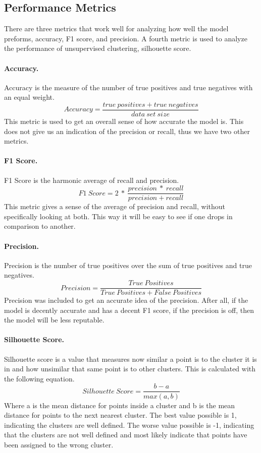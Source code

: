 \documentclass{article}
\begin{document}
\subsection{Performance Metrics} \label{Performance_Metrics}
\par
There are three metrics that work well for analyzing how well the model preforms, accuracy, F1 score, and precision. A fourth metric is used to analyze the performance of unsupervised clustering, silhouette score.

\paragraph{Accuracy.}
Accuracy is the measure of the number of true positives and true negatives with an equal weight.
$$Accuracy = \frac{true\ positives + true\ negatives}{data\ set\ size}$$
This metric is used to get an overall sense of how accurate the model is. This does not give us an indication of the precision or recall, thus we have two other metrics.

\paragraph{F1 Score.}
F1 Score is the harmonic average of recall and precision.
$$F1\ Score = 2\ \ast \ \frac{precision\ \ast \ recall}{precision + recall}$$
This metric gives a sense of the average of precision and recall, without specifically looking at both. This way it will be easy to see if one drops in comparison to another.

\paragraph{Precision.}
Precision is the number of true positives over the sum of true positives and true negatives.
$$Precision = \frac{True\ Positives}{True\ Positives + False\ Positives}$$
Precision was included to get an accurate idea of the precision. After all, if the model is decently accurate and has a decent F1 score, if the precision is off, then the model will be less reputable.

\paragraph{Silhouette Score.} \label{Sil_score}
Silhouette score is a value that measures now similar a point is to the cluster it is in and how unsimilar that same point is to other clusters. This is calculated with the following equation.
$$Silhouette\ Score =\frac{b-a}{max(a,b)}$$
Where a is the mean distance for points inside a cluster and b is the mean distance for points to the next nearest cluster. The best value possible is 1, indicating the clusters are well defined. The worse value possible is -1, indicating that the clusters are not well defined and most likely indicate that points have been assigned to the wrong cluster.
\end{document}
